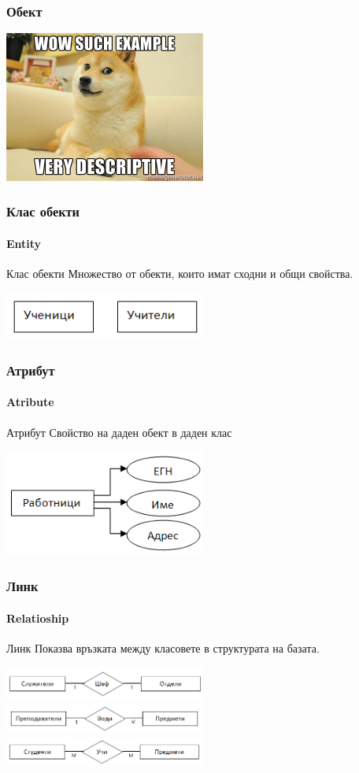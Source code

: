 \documentclass{beamer}
\begin{document}
  \begin{frame}
    \frametitle{Обект}
    \includegraphics[width=250px]{img/doge}
  \end{frame}

  \begin{frame}
    \frametitle{Клас обекти}
    \framesubtitle{Entity}
    \begin{block}{Клас обекти}
      Множество от обекти, които имат сходни и общи свойства.
    \end{block}
    \includegraphics[width=250px]{img/entity}
  \end{frame}

  \begin{frame}
    \frametitle{Атрибут}
    \framesubtitle{Atribute}
    \begin{block}{Атрибут}
       Свойство на даден обект в даден клас
    \end{block}
    \includegraphics[width=250px]{img/atribute}
  \end{frame}

  \begin{frame}
    \frametitle{Линк}
    \framesubtitle{Relatioship}
    \begin{block}{Линк}
      Показва връзката между класовете в структурата на базата.
    \end{block}
    \includegraphics[width=250px]{img/relation_11}\\
    \includegraphics[width=250px]{img/relation_1m}\\
    \includegraphics[width=250px]{img/relation_mm}
  \end{frame}
  
\end{document}
